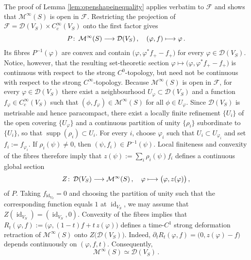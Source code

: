 \documentclass{amsart}
\theoremstyle{definition}
\def\co{\colon\thinspace}
\newcommand{\DD}{\mathcal D}
\newcommand{\FF}{\mathcal F}
\newcommand{\MM}{\mathcal M}
\newcommand{\lra}{\longrightarrow}
\DeclareMathOperator{\id}{\mathrm{id}}
\DeclareMathOperator{\supp}{\mathrm{supp}}
\begin{document}
The proof of
Lemma \ref{lem:openshapeinequality}
applies verbatim to $\FF$ and
shows that $\MM^{\infty}(S)$ is open in $\FF$.
Restricting the projection of
$\FF=\DD(V_S)\times C_c^{\infty}(V_S)$
onto the first factor gives
\[
P\co
\MM^{\infty}(S)\lra\DD(V_S)
\,,
\quad
(\varphi,f)\longmapsto\varphi
\,.
\]
Its fibres $P^{-1}(\varphi)$
are convex and contain
$\big(\varphi,\varphi^*f_+-f_+\big)$
for every $\varphi\in\DD(V_S)$.
Notice, however, that the resulting
set-theoretic section
$\varphi\mapsto\big(\varphi,\varphi^*f_+-f_+\big)$
is continuous with respect to the strong $C^0$-topology,
but need not be continuous with respect to
the strong $C^{\infty}$-topology.
Because $\MM^{\infty}(S)$ is open in $\FF$,
for every $\varphi\in\DD(V_S)$
there exist a neighbourhood
$U_{\varphi}\subset\DD(V_S)$
and a function $f_{\varphi}\in C_c^\infty(V_S)$
such that $(\phi,f_{\varphi})\in\MM^{\infty}(S)$
for all $\phi\in U_{\varphi}$.
Since $\DD(V_S)$ is metrisable and hence paracompact,
there exist a locally finite refinement
$\{U_i\}$ of the open covering $\{U_{\varphi}\}$
and a continuous partition of unity
$\{\rho_i\}$ subordinate to $\{U_i\}$,
so that $\supp(\rho_i)\subset U_i$.
For every $i$, choose $\varphi_i$ such that
$U_i\subset U_{\varphi_i}$ and set
$f_i:=f_{\varphi_i}$.
If $\rho_i(\psi)\neq0$, then $(\psi,f_i)\in P^{-1}(\psi)$.
Local finiteness and convexity of the fibres therefore imply
that $z(\psi):=\sum_i\rho_i(\psi)f_i$
defines a continuous global section
\[
Z\co\DD(V_S)\lra\MM^{\infty}(S)
\,,
\quad
\varphi\longmapsto
\big(\varphi,z(\varphi)\big)
\,,
\]
of $P$.
Taking $f_{\id_{V_S}}=0$
and choosing the partition of unity
such that the corresponding function equals $1$
at $\id_{V_S}$,
we may assume that
$Z(\id_{V_S})=(\id_{V_S},0)$.
Convexity of the fibres implies that
$R_t(\varphi,f):=\big(\varphi,(1-t)f+t\,z(\varphi)\big)$
defines a time-$C^1$ strong deformation retraction
of $\MM^{\infty}(S)$ onto $Z\big(\DD(V_S)\big)$.
Indeed,
$\partial_tR_t(\varphi,f)=\big(0,z(\varphi)-f\big)$
depends continuously on $(\varphi,f,t)$.
Consequently,
\[
\MM^{\infty}(S)\simeq\DD(V_S)
\,.
\]
\end{document}
